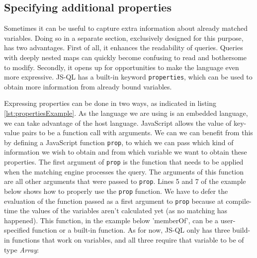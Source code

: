 \subsection{Specifying additional properties}
\label{subsec:props}
Sometimes it can be useful to capture extra information about already matched variables. Doing so in a separate section, exclusively designed for this purpose, has two advantages. First of all, it enhances the readability of queries. Queries with deeply nested maps can quickly become confusing to read and bothersome to modify. Secondly, it opens up for opportunities to make the language even more expressive. JS-QL has a built-in keyword \texttt{properties}, which can be used to obtain more information from already bound variables. 

Expressing properties can be done in two ways, as indicated in listing \ref{lst:propertiesExample}. As the language we are using is an embedded language, we can take advantage of the host language. JavaScript allows the value of key-value pairs to be a function call with arguments. We can we can benefit from this by defining a JavaScript function \texttt{prop}, to which we can pass which kind of information we wish to obtain and from which variable we want to obtain these properties. The first argument of \texttt{prop} is the function that needs to be applied when the matching engine processes the query. The arguments of this function are all other arguments that were passed to \texttt{prop}. Lines 5 and 7 of the example below shows how to properly use the \texttt{prop} function. We have to defer the evaluation of the function passed as a first argument to \texttt{prop} because at compile-time the values of the variables aren't calculated yet (as no matching has happened). This function, in the example below 'memberOf', can be a user-specified function or a built-in function. As for now, JS-QL only has three build-in functions that work on variables, and all three require that variable to be of type \textit{Array}:

